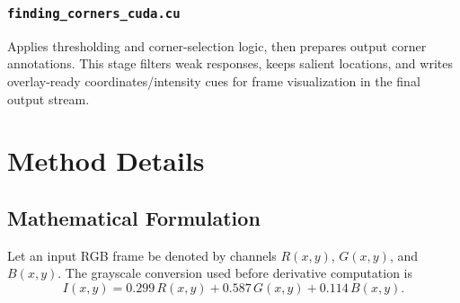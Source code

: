 \documentclass[conference]{IEEEtran}
\begin{document}
\subsubsection{\texttt{finding\_corners\_cuda.cu}}
Applies thresholding and corner-selection logic, then prepares output corner annotations. This stage filters weak responses, keeps salient locations, and writes overlay-ready coordinates/intensity cues for frame visualization in the final output stream.

\section{Method Details}
\subsection{Mathematical Formulation}
Let an input RGB frame be denoted by channels $R(x,y)$, $G(x,y)$, and $B(x,y)$. The grayscale conversion used before derivative computation is
\begin{equation}
I(x,y) = 0.299\,R(x,y) + 0.587\,G(x,y) + 0.114\,B(x,y).
\end{equation}
\end{document}
